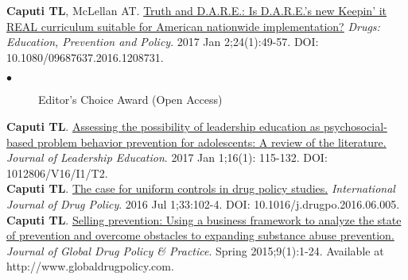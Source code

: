 \documentclass[10pt, letterpaper]{article}
\newcommand{\years}[1]{\marginnote{\normalsize #1}}
\begin{document}
\years{2017}\textbf{Caputi TL}, McLellan AT. \href{http://dx.doi.org/10.1080/09687637.2016.1208731}{Truth and D.A.R.E.: Is D.A.R.E.’s new Keepin’ it REAL curriculum suitable for American nationwide implementation?}  \textit{Drugs: Education, Prevention and Policy}. 2017 Jan 2;24(1):49-57. DOI: 10.1080/09687637.2016.1208731.
    \begin{description}
    \item[$\bullet$] Editor's Choice Award (Open Access)
    \end{description}
\years{2017}\textbf{Caputi TL}. \href{http://journalofleadershiped.org/attachments/article/479/0571_caputi.pdf}{Assessing the possibility of leadership education as psychosocial-based problem behavior prevention for adolescents: A review of the literature.} \textit{Journal of Leadership Education}. 2017 Jan 1;16(1): 115-132. DOI: 1012806/V16/I1/T2.\\[.2cm]
\years{2016}\textbf{Caputi TL}. \href{http://dx.doi.org/10.1016/j.drugpo.2016.06.005}{The case for uniform controls in drug policy studies.}  \textit{International Journal of Drug Policy}. 2016 Jul 1;33:102-4. DOI: 10.1016/j.drugpo.2016.06.005.\\[.2cm]
\years{2015}\textbf{Caputi TL}. \href{http://www.globaldrugpolicy.com}{Selling prevention: Using a business framework to analyze the state of prevention and overcome obstacles to expanding substance abuse prevention.} \textit{Journal of Global Drug Policy \& Practice}. Spring 2015;9(1):1-24. Available at http://www.globaldrugpolicy.com. \\[.2cm]
\end{document}
